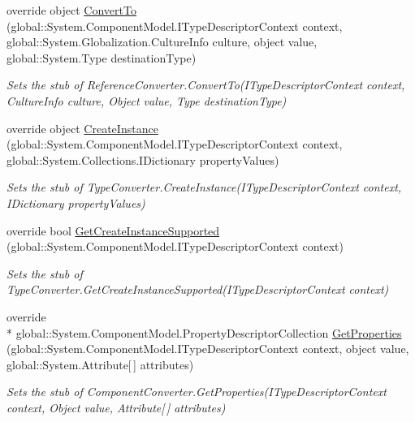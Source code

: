 \begin{DoxyCompactItemize}
override object \hyperlink{class_system_1_1_component_model_1_1_fakes_1_1_stub_component_converter_ac34ad7dcd83ce74bca503b312127a33a}{Convert\-To} (global\-::\-System.\-Component\-Model.\-I\-Type\-Descriptor\-Context context, global\-::\-System.\-Globalization.\-Culture\-Info culture, object value, global\-::\-System.\-Type destination\-Type)
\begin{DoxyCompactList}\small\item\em Sets the stub of Reference\-Converter.\-Convert\-To(\-I\-Type\-Descriptor\-Context context, Culture\-Info culture, Object value, Type destination\-Type)\end{DoxyCompactList}\item 
override object \hyperlink{class_system_1_1_component_model_1_1_fakes_1_1_stub_component_converter_ae6bf1ccd566b95f98709b1a95c9b1d55}{Create\-Instance} (global\-::\-System.\-Component\-Model.\-I\-Type\-Descriptor\-Context context, global\-::\-System.\-Collections.\-I\-Dictionary property\-Values)
\begin{DoxyCompactList}\small\item\em Sets the stub of Type\-Converter.\-Create\-Instance(\-I\-Type\-Descriptor\-Context context, I\-Dictionary property\-Values)\end{DoxyCompactList}\item 
override bool \hyperlink{class_system_1_1_component_model_1_1_fakes_1_1_stub_component_converter_ad6b450567123bb45263780de7e7509cd}{Get\-Create\-Instance\-Supported} (global\-::\-System.\-Component\-Model.\-I\-Type\-Descriptor\-Context context)
\begin{DoxyCompactList}\small\item\em Sets the stub of Type\-Converter.\-Get\-Create\-Instance\-Supported(\-I\-Type\-Descriptor\-Context context)\end{DoxyCompactList}\item 
override \\*
global\-::\-System.\-Component\-Model.\-Property\-Descriptor\-Collection \hyperlink{class_system_1_1_component_model_1_1_fakes_1_1_stub_component_converter_afdde54fa04f48e77451b0c853d5b1af4}{Get\-Properties} (global\-::\-System.\-Component\-Model.\-I\-Type\-Descriptor\-Context context, object value, global\-::\-System.\-Attribute\mbox{[}$\,$\mbox{]} attributes)
\begin{DoxyCompactList}\small\item\em Sets the stub of Component\-Converter.\-Get\-Properties(\-I\-Type\-Descriptor\-Context context, Object value, Attribute\mbox{[}$\,$\mbox{]} attributes)\end{DoxyCompactList}\item 

\end{DoxyCompactItemize}
